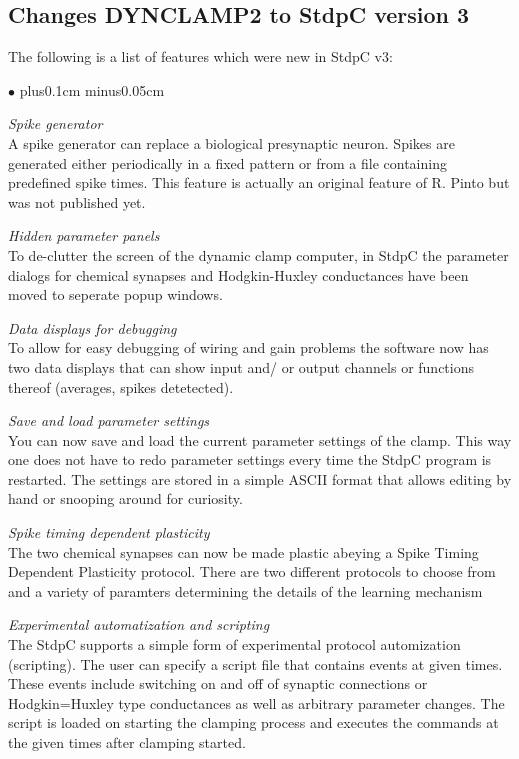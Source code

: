 \documentclass{article}
\newenvironment{myitem}{\begin{list}{$\bullet$}{\setlength{\leftmargin}{1.1em}
\itemsep0.1cm plus0.1cm minus0.05cm
\listparindent0cm
\addtolength{\labelsep}{0.5\labelsep}
\setlength{\labelwidth}{0.8em}
\setlength{\leftmargin}{\labelwidth}
\addtolength{\leftmargin}{\labelsep}
}}{\end{list}}
\begin{document}
\subsection{Changes DYNCLAMP2 to StdpC version 3}
The following is a list of features which were new in StdpC v3: 
\begin{myitem}
  \item {\em Spike generator} \\
    A spike generator can replace a biological presynaptic neuron. Spikes are
    generated either periodically in a fixed pattern or from a file
    containing predefined spike times. This feature is actually an original
    feature of R. Pinto but was not published yet.
  \item {\em Hidden parameter panels} \\
    To de-clutter the screen of the dynamic clamp computer, in StdpC the
    parameter dialogs for chemical synapses and Hodgkin-Huxley conductances
    have been moved to seperate popup windows.
  \item {\em Data displays for debugging} \\
    To allow for easy debugging of wiring and gain problems the software now
    has two data displays that can show input and/ or output channels or
    functions thereof (averages, spikes detetected).
  \item {\em Save and load parameter settings} \\
    You can now save and load the current parameter settings of the
    clamp. This way one does not have to redo parameter settings every time
    the StdpC program is restarted. The settings are stored in a simple ASCII
    format that allows editing by hand or snooping around for curiosity. 
  \item {\em Spike timing dependent plasticity} \\
    The two chemical synapses can now be made plastic abeying a Spike Timing
    Dependent Plasticity protocol. There are two different protocols to
    choose from and a variety of paramters determining the details of the
    learning mechanism
  \item {\em Experimental automatization and scripting} \\
    The StdpC supports a simple form of experimental protocol automization
    (scripting). The user can specify a script file that contains events at
    given times. These events include switching on and off of synaptic
    connections or Hodgkin=Huxley type conductances as well as arbitrary
    parameter changes. The script is loaded on starting the clamping process
    and executes the commands at the given times after clamping started.
\end{myitem}
\end{document}
